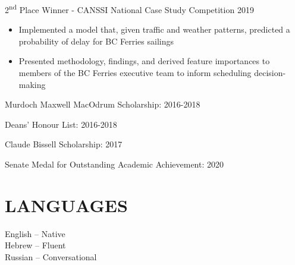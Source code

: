 \documentclass[margin]{res}
\newcommand{\ts}{\textsuperscript}
\begin{document}
\begin{resume}
\begin{itemize}
      \item{2\ts{nd} Place Winner - CANSSI National Case Study Competition 2019 \begin{itemize}
            \item{Implemented a model that, given traffic and weather patterns, predicted a probability of delay for BC Ferries sailings}
            \item{Presented methodology, findings, and derived feature importances to members of the BC Ferries executive team to inform scheduling decision-making}
      \end{itemize}
      \item{Murdoch Maxwell MacOdrum Scholarship: 2016-2018}
      \item{Deans' Honour List: 2016-2018}
      \item{Claude Bissell Scholarship: 2017}
      \item{Senate Medal for Outstanding Academic Achievement: 2020}
      }
      
\end{itemize}

\section{LANGUAGES}
English -- Native \\
Hebrew -- Fluent \\
Russian -- Conversational            

\end{resume}
\end{document}
